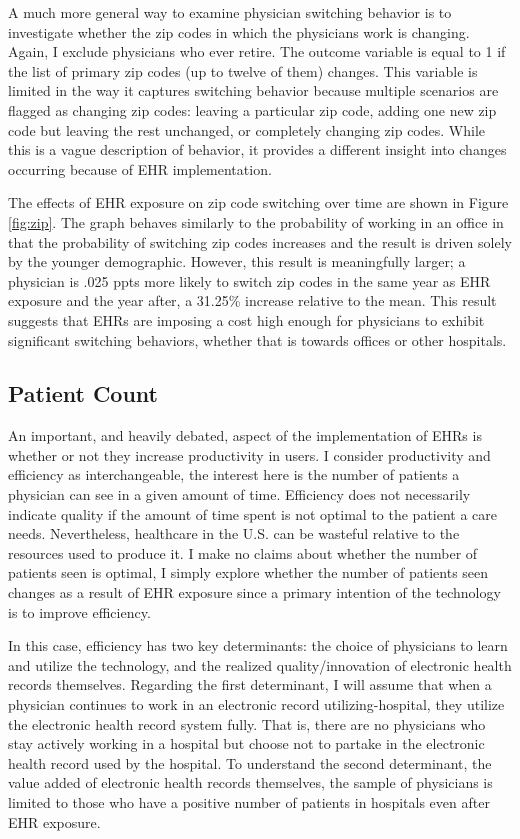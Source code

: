 \documentclass[11pt]{article}
\begin{document}
A much more general way to examine  physician switching behavior is to investigate whether the zip codes in which the physicians work is changing. Again, I exclude physicians who ever retire. The outcome variable is equal to 1 if the list of primary zip codes (up to twelve of them) changes. This variable is limited in the way it captures switching behavior because multiple scenarios are flagged as changing zip codes: leaving a particular zip code, adding one new zip code but leaving the rest unchanged, or completely changing zip codes. While this is a vague description of behavior, it provides a different insight into changes occurring because of EHR implementation.

The effects of EHR exposure on zip code switching over time are shown in Figure \ref{fig:zip}. The graph behaves similarly to the probability of working in an office in that the probability of switching zip codes increases and the result is driven solely by the younger demographic. However, this result is meaningfully larger; a physician is .025 ppts more likely to switch zip codes in the same year as EHR exposure and the year after, a 31.25\% increase relative to the mean. This result suggests that EHRs are imposing a cost high enough for physicians to exhibit significant switching behaviors, whether that is towards offices or other hospitals.




\subsection{Patient Count}

An important, and heavily debated, aspect of the implementation of EHRs is whether or not they increase productivity in users. I consider productivity and efficiency as interchangeable, the interest here is the number of patients a physician can see in a given amount of time. Efficiency does not necessarily indicate quality if the amount of time spent is not optimal to the patient a care needs. Nevertheless, healthcare in the U.S. can be wasteful relative to the resources used to produce it. I make no claims about whether the number of patients seen is optimal, I simply explore whether the number of patients seen changes as a result of EHR exposure since a primary intention of the technology is to improve efficiency. 

In this case, efficiency has two key determinants: the choice of physicians to learn and utilize the technology, and the realized quality/innovation of electronic health records themselves. Regarding the first determinant, I will assume that when a physician continues to work in an electronic record utilizing-hospital, they utilize the electronic health record system fully. That is, there are no physicians who stay actively working in a hospital but choose not to partake in the electronic health record used by the hospital. To understand the second determinant, the value added of electronic health records themselves, the sample of physicians is limited to those who have a positive number of patients in hospitals even after EHR exposure. 
\end{document}
